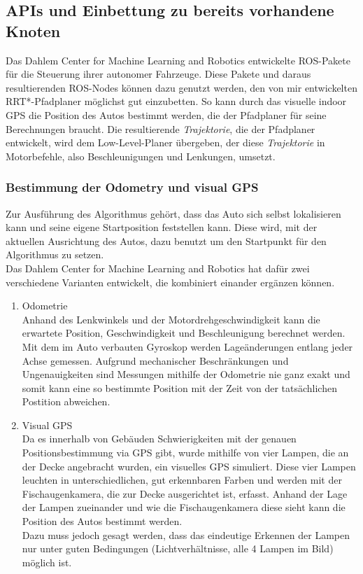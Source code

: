 \subsection{APIs und Einbettung zu bereits vorhandene Knoten}
Das Dahlem Center for Machine Learning and Robotics entwickelte ROS-Pakete für die Steuerung ihrer autonomer Fahrzeuge. Diese Pakete und daraus resultierenden ROS-Nodes können dazu genutzt werden, den von mir entwickelten RRT*-Pfadplaner möglichst gut einzubetten. So kann durch das visuelle indoor GPS die Position des Autos bestimmt werden, die der Pfadplaner für seine Berechnungen braucht. Die resultierende \textit{Trajektorie}, die der Pfadplaner entwickelt, wird dem Low-Level-Planer übergeben, der diese \textit{Trajektorie} in Motorbefehle, also Beschleunigungen und Lenkungen, umsetzt. 
\subsubsection{Bestimmung der Odometry und visual GPS}
Zur Ausführung des Algorithmus gehört, dass das Auto sich selbst lokalisieren kann und seine eigene Startposition feststellen kann. Diese wird, mit der aktuellen Ausrichtung des Autos, dazu benutzt um den Startpunkt für den Algorithmus zu setzen. \\
Das Dahlem Center for Machine Learning and Robotics hat dafür zwei verschiedene Varianten entwickelt, die kombiniert einander ergänzen können. \\
\begin{enumerate}
\item Odometrie \\
Anhand des Lenkwinkels und der Motordrehgeschwindigkeit kann die erwartete Position, Geschwindigkeit und Beschleunigung berechnet werden. Mit dem im Auto verbauten Gyroskop werden Lageänderungen entlang jeder Achse gemessen. Aufgrund mechanischer Beschränkungen und Ungenauigkeiten sind Messungen mithilfe der Odometrie nie ganz exakt und somit kann eine so bestimmte Position mit der Zeit von der tatsächlichen Postition abweichen.
\item Visual GPS\\
Da es innerhalb von Gebäuden Schwierigkeiten mit der genauen Positionsbestimmung via GPS gibt, wurde mithilfe von vier Lampen, die an der Decke angebracht wurden, ein visuelles GPS simuliert. Diese vier Lampen leuchten in unterschiedlichen, gut erkennbaren Farben und werden mit der Fischaugenkamera, die zur Decke ausgerichtet ist, erfasst. Anhand der Lage der Lampen zueinander und wie die Fischaugenkamera diese sieht kann die Position des Autos bestimmt werden.\\
Dazu muss jedoch gesagt werden, dass das eindeutige Erkennen der Lampen nur unter guten Bedingungen (Lichtverhältnisse, alle 4 Lampen im Bild) möglich ist. 
\end{enumerate}

